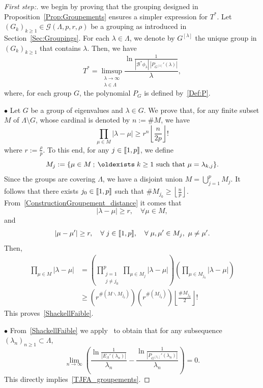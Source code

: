 \documentclass[AHL,Unicode,longabstracts]{cedram}
\newenvironment{step}[1]{\begin{proof}[#1]}{\let\qed\relax\end{proof}}
\newcommand{\llbracket}{\mathopen{[\mkern -2.7mu[}}
\newcommand{\rrbracket}{\mathclose{]\mkern -2.7mu]}}
\newcommand{\inter}[2]{\llbracket #1,#2 \rrbracket}
\newcommand\Bs{\mathcal{B}^*}
\renewcommand*{\exists}{\mathrel{\oldexists}}
\let\oldforall\forall
\renewcommand*{\forall}{\mathrel{\oldforall}}
\begin{document}
\begin{proofc}
\begin{step}{First step:}
we begin by proving that the grouping designed in Proposition~\ref{Prop:Groupements} ensures a simpler expression for $T^*$. Let $(G_k)_{k \geq 1}\in \mathcal{G}(\Lambda,p,r,\rho)$ be a grouping as introduced in Section~\ref{Sec:Groupings}. For each $\lambda\in \Lambda$, we denote by $G^{[\lambda]}$ the unique group in $(G_k)_{k\geq 1}$ that contains $\lambda$. Then, we have
\begin{equation}\label{TJFA_groupements}
T^*=\limsup_{\substack{\lambda\to \infty\\ \lambda\in \Lambda}} \frac{\ln \frac{1}{| \Bs\phi_\lambda | \: | P_{G^{[\lambda]}}' (\lambda) |}}{ \lambda },
\end{equation}
where, for each group $G$, the polynomial $P_G$ is defined by~\eqref{Def:P}.


\noindent $\bullet$ Let $G$ be a group of eigenvalues and $\lambda \in G$. We prove that, for any finite subset $M$ of $\Lambda\setminus G$, whose cardinal is denoted by $n:=\# M$, we have
\begin{equation}\label{ShackellFaible}
\prod_{\mu \in M} |\lambda- \mu| \geq r^n \left\lfloor \frac{n}{2p} \right\rfloor !
\end{equation}
where $r:= \frac{\rho}{p}$. To this end, for any $j \in \inter{1}{p}$, we define
\[
M_j := \{ \mu\in M \: ; \: \exists k \geq 1 \text{ such that } \mu = \lambda_{k,j} \}.
\]
Since the groups are covering $\Lambda$, we have a disjoint union $M = \displaystyle\bigcup_{j=1}^p M_j$. It follows that there exists $j_0 \in \inter{1}{p}$ such that $\# M_{j_0} \geq \left\lfloor \frac{n}{p} \right\rfloor$. From~\eqref{ConstructionGroupement_distance} it comes that
\[
|\lambda - \mu | \geq r, \quad \forall \mu \in M,
\]
and
\[
|\mu - \mu'| \geq r, \quad \forall j \in \inter{1}{p},\quad\forall \mu, \mu' \in M_j, \ \mu\neq \mu'.
\]
Then,
\begin{align*}
\prod_{\mu \in M} |\lambda- \mu| &= \left(\prod_{\substack{j=1 \\ j \neq j_0}}^p \prod_{\mu \in M_j} |\lambda-\mu| \right) \left(\prod_{\mu \in M_{j_0}} |\lambda-\mu|\right)
\\
&\geq \left(r^{\# (M\backslash M_{j_0})} \right) \left(r^{\# (M_{j_0})}\right) \left\lfloor \frac{\#M_{j_0}}{2} \right\rfloor!
\end{align*}
This proves~\eqref{ShackellFaible}.

\medskip
\noindent $\bullet$ From~\eqref{ShackellFaible} we apply~\cite[Theorem~3.8]{AmmarKhodjaBenabdallahGonzalez-BurgosdeTeresa:2014} to obtain that for any subsequence $(\lambda_n)_{n \geq 1} \subset \Lambda$,
\begin{equation}\label{JFA_Th3.8}
\lim_{n \to \infty} \left(\frac{\ln \frac{1}{|E_\Lambda'(\lambda_n)|}}{\lambda_n} - \frac{\ln \frac{1}{|P_{G^{[\lambda_n]}}'(\lambda_n)|}}{\lambda_n} \right) = 0.
\end{equation}
This directly implies~\eqref{TJFA_groupements}.


\end{step}
\end{proofc}
\end{document}
